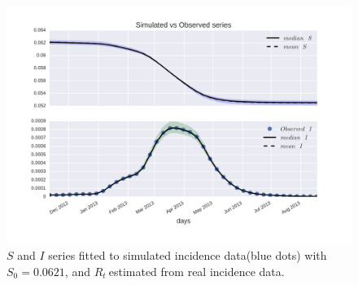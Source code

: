 \documentclass[a4paper,10pt]{article}
\def \rr {$R_{t}\:$}
\begin{document}
\begin{figure}
 \centering
 \includegraphics[width=14cm]{./plots/Sim_DengueS2012_11_series.png}
 \caption{$S$ and $I$ series fitted to simulated incidence data(blue dots) 
with $S_0=0.0621$, and \rr estimated from real incidence data.}
 \label{fig:sim_data}
\end{figure}



\end{document}
